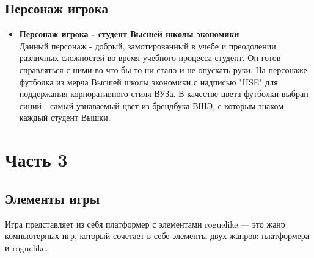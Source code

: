 \documentclass{article}
\begin{document}
\subsection*{Персонаж игрока}

\begin{itemize}
    \item \textbf{Персонаж игрока - студент Высшей школы экономики} \\ 
    Данный персонаж - добрый, замотированный в учебе и преодолении различных сложностей во время учебного процесса студент. Он готов справляться с ними во что бы то ни стало и не опускать руки. На персонаже футболка из мерча Высшей школы экономики с надписью "HSE" для поддержания корпоративного стиля ВУЗа. В качестве цвета футболки выбран синий - самый узнаваемый цвет из брендбука ВШЭ, с которым знаком каждый студент Вышки. 
\end{itemize}

\section{Часть 3}

\subsection*{Элементы игры}

Игра представляет из себя платформер с элементами roguelike — это жанр компьютерных игр, который сочетает в себе элементы двух жанров: платформера и roguelike.
\end{document}
